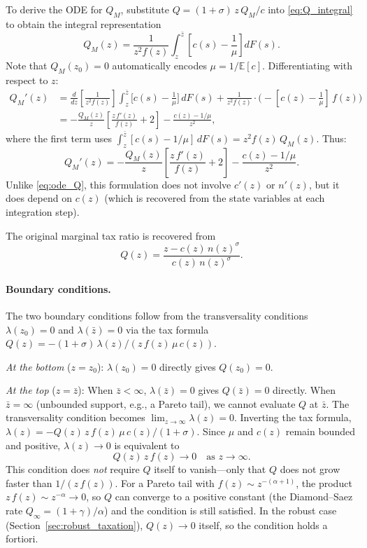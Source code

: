 \documentclass[12pt,a4paper]{article}
\theoremstyle{definition}
\theoremstyle{plain}
\theoremstyle{remark}
\newcommand{\E}{\mathbb{E}}
\newcommand{\zbar}{\bar{z}}
\newcommand{\zlow}{z_{\scriptscriptstyle 0}}
\begin{document}
To derive the ODE for $Q_M$, substitute $Q = (1+\sigma)\,z\,Q_M/c$ into \eqref{eq:Q_integral} to obtain the integral representation
\[
  Q_M(z) = \frac{1}{z^2 f(z)} \int_{z}^{\zbar} \left[c(s) - \frac{1}{\mu}\right] dF(s).
\]
Note that $Q_M(\zlow) = 0$ automatically encodes $\mu = 1/\E[c]$.
Differentiating with respect to $z$:
\begin{align*}
  Q_M'(z) &= \frac{d}{dz}\!\left[\frac{1}{z^2 f(z)}\right] \int_{z}^{\zbar} \bigl[c(s) - \tfrac{1}{\mu}\bigr]\,dF(s) + \frac{1}{z^2 f(z)}\cdot\bigl(-[c(z)-\tfrac{1}{\mu}]\,f(z)\bigr) \\
  &= -\frac{Q_M(z)}{z}\!\left[\frac{z\,f'(z)}{f(z)} + 2\right] - \frac{c(z) - 1/\mu}{z^2},
\end{align*}
where the first term uses $\int_{z}^{\zbar}[c(s)-1/\mu]\,dF(s) = z^2 f(z)\, Q_M(z)$. Thus:
\begin{equation}
  \boxed{Q_M'(z) = -\frac{Q_M(z)}{z}\!\left[\frac{z\,f'(z)}{f(z)} + 2\right] - \frac{c(z) - 1/\mu}{z^2}.}
  \label{eq:ode_QM}
\end{equation}
Unlike \eqref{eq:ode_Q}, this formulation does not involve $c'(z)$ or $n'(z)$, but it does depend on $c(z)$ (which is recovered from the state variables at each integration step).

The original marginal tax ratio is recovered from
\begin{equation}
  Q(z) = \frac{z - c(z)\,n(z)^{\sigma}}{c(z)\,n(z)^{\sigma}}.
  \label{eq:Q_from_h}
\end{equation}

\paragraph{Boundary conditions.} The two boundary conditions follow from the transversality conditions $\lambda(\zlow) = 0$ and $\lambda(\zbar) = 0$ via the tax formula $Q(z) = -(1+\sigma)\,\lambda(z)/(z\,f(z)\,\mu\,c(z))$.

\emph{At the bottom} ($z = \zlow$): $\lambda(\zlow) = 0$ directly gives $Q(\zlow) = 0$.

\emph{At the top} ($z = \zbar$): When $\zbar < \infty$, $\lambda(\zbar) = 0$ gives $Q(\zbar) = 0$ directly. When $\zbar = \infty$ (unbounded support, e.g., a Pareto tail), we cannot evaluate $Q$ at $\zbar$. The transversality condition becomes $\lim_{z \to \infty} \lambda(z) = 0$. Inverting the tax formula, $\lambda(z) = -Q(z)\,z\,f(z)\,\mu\,c(z)/(1+\sigma)$. Since $\mu$ and $c(z)$ remain bounded and positive, $\lambda(z) \to 0$ is equivalent to
\[
  Q(z)\,z\,f(z) \to 0 \quad \text{as } z \to \infty.
\]
This condition does \emph{not} require $Q$ itself to vanish---only that $Q$ does not grow faster than $1/(z\,f(z))$. For a Pareto tail with $f(z) \sim z^{-(\alpha+1)}$, the product $z\,f(z) \sim z^{-\alpha} \to 0$, so $Q$ can converge to a positive constant (the Diamond--Saez rate $Q_\infty = (1+\gamma)/\alpha$) and the condition is still satisfied. In the robust case (Section~\ref{sec:robust_taxation}), $Q(z) \to 0$ itself, so the condition holds a fortiori.
\end{document}
